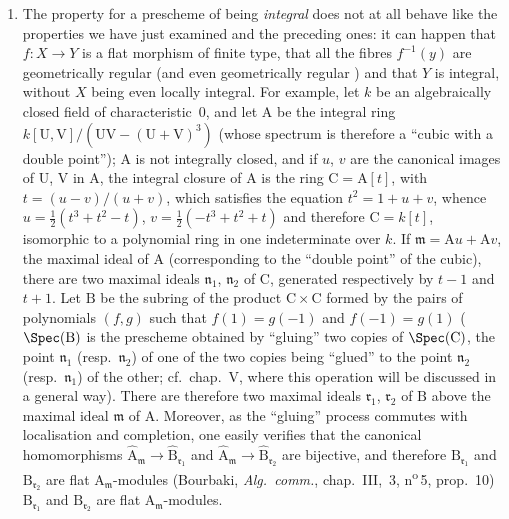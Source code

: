 \begin{remarks}[6.5.5]
\begin{enumerate}[label=(\roman*)]
  \item The property for a prescheme of being \emph{integral} does not at all behave like the properties we have just examined and the preceding ones: it can happen that $f:X\to Y$ is a flat morphism of finite type, that all the fibres $f^{-1}(y)$ are geometrically regular (and even geometrically regular ) and that $Y$ is integral, without $X$ being even locally integral.
For example, let $k$ be an algebraically closed field of characteristic~$0$, and let $\mathrm{A}$ be the integral ring $k[\mathrm{U},\mathrm{V}]/(\mathrm{U}\mathrm{V}-(\mathrm{U}+\mathrm{V})^3)$ (whose spectrum is therefore a ``cubic with a double point''); $\mathrm{A}$ is not integrally closed, and if $u$, $v$ are the canonical images of $\mathrm{U}$, $\mathrm{V}$ in $\mathrm{A}$, the integral closure of $\mathrm{A}$ is the ring $\mathrm{C}=\mathrm{A}[t]$, with $t=(u-v)/(u+v)$, which satisfies the equation $t^2=1+u+v$, whence $u=\frac{1}{2}(t^3+t^2-t)$, $v=\frac{1}{2}(-t^3+t^2+t)$ and therefore $\mathrm{C}=k[t]$, isomorphic to a polynomial ring in one indeterminate over $k$.
If $\mathfrak{m}=\mathrm{A} u+\mathrm{A} v$, the maximal ideal of $\mathrm{A}$ (corresponding to the ``double point'' of the cubic), there are two maximal ideals $\mathfrak{n}_1$, $\mathfrak{n}_2$ of $\mathrm{C}$, generated respectively by $t-1$ and $t+1$.
Let $\mathrm{B}$ be the subring of the product $\mathrm{C}\times\mathrm{C}$ formed by the pairs of polynomials $(f,g)$ such that $f(1)=g(-1)$ and $f(-1)=g(1)$ ($\Spec(\mathrm{B})$ is the prescheme obtained by ``gluing'' two copies of $\Spec(\mathrm{C})$, the point $\mathfrak{n}_1$ (resp.\ $\mathfrak{n}_2$) of one of the two copies being ``glued'' to the point $\mathfrak{n}_2$ (resp.\ $\mathfrak{n}_1$) of the other; cf.\ chap.~V, where this operation will be discussed in a general way).
There are therefore two maximal ideals $\mathfrak{r}_1$, $\mathfrak{r}_2$ of $\mathrm{B}$ above the maximal ideal $\mathfrak{m}$ of $\mathrm{A}$.
Moreover, as the ``gluing'' process commutes with localisation and completion, one easily verifies that the canonical homomorphisms $\hat{\mathrm{A}}_\mathfrak{m}\to\hat{\mathrm{B}}_{\mathfrak{r}_1}$ and $\hat{\mathrm{A}}_\mathfrak{m}\to\hat{\mathrm{B}}_{\mathfrak{r}_2}$ are bijective, and therefore $\mathrm{B}_{\mathfrak{r}_1}$ and $\mathrm{B}_{\mathfrak{r}_2}$ are flat $\mathrm{A}_\mathfrak{m}$-modules (Bourbaki, \emph{Alg.\ comm.}, chap.~III, \textsection\,3, n\textsuperscript{o}\,5, prop.~10) $\mathrm{B}_{\mathfrak{r}_1}$ and $\mathrm{B}_{\mathfrak{r}_2}$ are flat $\mathrm{A}_\mathfrak{m}$-modules.

\end{enumerate}
\end{remarks}
